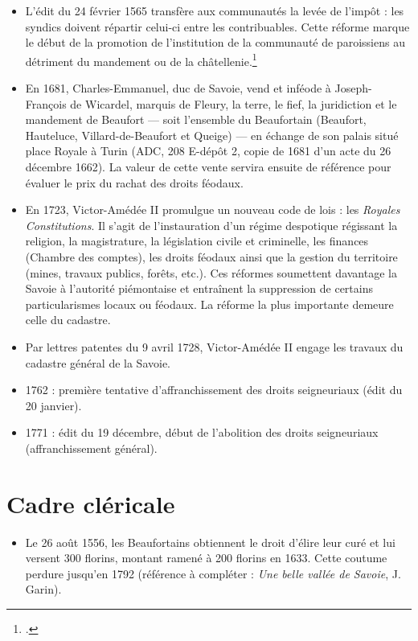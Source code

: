 \documentclass[12pt,a4paper]{report}
\begin{document}
\begin{itemize}
	\item L’édit du 24 février 1565 transfère aux communautés la levée de l’impôt : les syndics doivent répartir celui-ci entre les contribuables. Cette réforme marque le début de la promotion de l’institution de la communauté de paroissiens au détriment du mandement ou de la châtellenie.\footcite[272]{HVialletSel}
	
	\item En 1681, Charles-Emmanuel, duc de Savoie, vend et inféode à Joseph-François de Wicardel, marquis de Fleury, la terre, le fief, la juridiction et le mandement de Beaufort --- soit l’ensemble du Beaufortain (Beaufort, Hauteluce, Villard-de-Beaufort et Queige) --- en échange de son palais situé place Royale à Turin (ADC, 208 E-dépôt 2, copie de 1681 d’un acte du 26 décembre 1662). La valeur de cette vente servira ensuite de référence pour évaluer le prix du rachat des droits féodaux.
	
	\item En 1723, Victor-Amédée II promulgue un nouveau code de lois : les \textit{Royales Constitutions}. Il s’agit de l’instauration d’un régime despotique régissant la religion, la magistrature, la législation civile et criminelle, les finances (Chambre des comptes), les droits féodaux ainsi que la gestion du territoire (mines, travaux publics, forêts, etc.). Ces réformes soumettent davantage la Savoie à l’autorité piémontaise et entraînent la suppression de certains particularismes locaux ou féodaux. La réforme la plus importante demeure celle du cadastre.
	
	\item Par lettres patentes du 9 avril 1728, Victor-Amédée II engage les travaux du cadastre général de la Savoie.
	

	
	\item 1762 : première tentative d’affranchissement des droits seigneuriaux (édit du 20 janvier).
	
	\item 1771 : édit du 19 décembre, début de l’abolition des droits seigneuriaux (affranchissement général).
	
\end{itemize}

\section*{Cadre cléricale}

\begin{itemize}
	
	\item Le 26 août 1556, les Beaufortains obtiennent le droit d’élire leur curé et lui versent 300 florins, montant ramené à 200 florins en 1633. Cette coutume perdure jusqu’en 1792 (référence à compléter : \textit{Une belle vallée de Savoie}, J. Garin).
	
	
	
\end{itemize}
\end{document}
